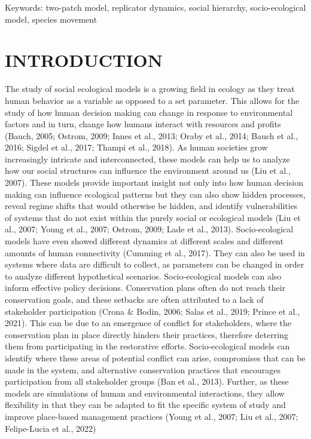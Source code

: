 \documentclass[
  12pt,
]{article}
\begin{document}
Keywords: two-patch model, replicator dynamics, social hierarchy, socio-ecological model, species movement

\hypertarget{introduction}{%
\section{INTRODUCTION}\label{introduction}}

The study of social ecological models is a growing field in ecology as they treat human behavior as a variable as opposed to a set parameter. This allows for the study of how human decision making can change in response to environmental factors and in turn, change how humans interact with resources and profits (Bauch, 2005; Ostrom, 2009; Innes et al., 2013; Oraby et al., 2014; Bauch et al., 2016; Sigdel et al., 2017; Thampi et al., 2018). As human societies grow increasingly intricate and interconnected, these models can help us to analyze how our social structures can influence the environment around us (Liu et al., 2007). These models provide important insight not only into how human decision making can influence ecological patterns but they can also show hidden processes, reveal regime shifts that would otherwise be hidden, and identify vulnerabilities of systems that do not exist within the purely social or ecological models (Liu et al., 2007; Young et al., 2007; Ostrom, 2009; Lade et al., 2013). Socio-ecological models have even showed different dynamics at different scales and different amounts of human connectivity (Cumming et al., 2017). They can also be used in systems where data are difficult to collect, as parameters can be changed in order to analyze different hypothetical scenarios. Socio-ecological models can also inform effective policy decisions. Conservation plans often do not reach their conservation goals, and these setbacks are often attributed to a lack of stakeholder participation (Crona \& Bodin, 2006; Salas et al., 2019; Prince et al., 2021). This can be due to an emergence of conflict for stakeholders, where the conservation plan in place directly hinders their practices, therefore deterring them from participating in the restorative efforts. Socio-ecological models can identify where these areas of potential conflict can arise, compromises that can be made in the system, and alternative conservation practices that encourages participation from all stakeholder groups (Ban et al., 2013). Further, as these models are simulations of human and environmental interactions, they allow flexibility in that they can be adapted to fit the specific system of study and improve place-based management practices (Young et al., 2007; Liu et al., 2007; Felipe-Lucia et al., 2022)
\end{document}

